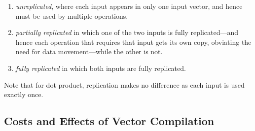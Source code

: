 \begin{enumerate}[label=(\roman*)]
\item {\em unreplicated}, where each input appears in only one input vector, and hence must be used by multiple operations.
\item {\em partially replicated} in which one of the two inputs is fully replicated---and hence each operation that requires that input gets its own copy, obviating the need for data movement---while the other is not.
\item {\em fully replicated} in which both inputs are fully replicated. 
\end{enumerate}
Note that for dot product, replication makes no difference as each input is used exactly once.

\subsection{Costs and Effects of Vector Compilation}\label{sec:compilation-stuff}

